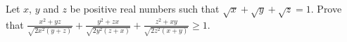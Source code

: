 Let $x$, $y$ and $z$ be positive real numbers such that $\sqrt{x}+\sqrt{y}+\sqrt{z}= 1$. Prove that $\frac{x^{2}+yz}{\sqrt{2x^{2}(y+z)}}+\frac{y^{2}+zx}{\sqrt{2y^{2}(z+x)}}+\frac{z^{2}+xy}{\sqrt{2z^{2}(x+y)}}\geq 1$.